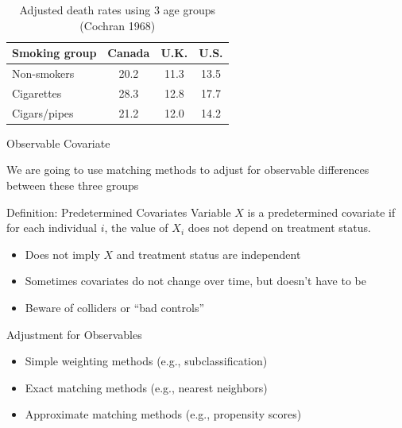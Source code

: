\documentclass{beamer}
\begin{document}
\begin{frame}[plain]

	\begin{table}\centering
	\caption{Adjusted death rates using 3 age groups (Cochran 1968)}
		\begin{center}
		\begin{tabular}{lccc}
		\hline \hline
		\multicolumn{1}{l}{Smoking group}&
		\multicolumn{1}{c}{Canada}&
		\multicolumn{1}{c}{U.K.}&
		\multicolumn{1}{c}{U.S.}\\
		\hline
		Non-smokers & 20.2 & 11.3 & 13.5 \\
		Cigarettes & 28.3 & 12.8  &  17.7 \\
		Cigars/pipes & 21.2 & 12.0 & 14.2 \\
		\hline
		\end{tabular}
		\end{center}
	\end{table}

\end{frame}

\begin{frame}{Observable Covariate}
	
	We are going to use matching methods to adjust for observable differences between these three groups
	
	\begin{block}{Definition: Predetermined Covariates}
	Variable $X$ is a predetermined covariate if for each individual $i$, the value of $X_i$ does not depend on treatment status.
	\end{block}
	
	\begin{itemize}
	\item Does not imply $X$ and treatment status are independent 
	\item Sometimes covariates do not change over time, but doesn't have to be 
	\item Beware of colliders or ``bad controls'' 
	\end{itemize}
	
\end{frame}

\begin{frame}{Adjustment for Observables}
	
	\begin{itemize}
	\item Simple weighting methods (e.g., subclassification)
	\item Exact matching methods (e.g., nearest neighbors)
	\item Approximate matching methods (e.g., propensity scores)
	\end{itemize}
\end{frame}
\end{document}
